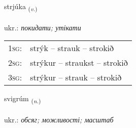\documentclass[frontgrid, backgrid]{flacards}\usepackage[]{graphicx}\usepackage[]{xcolor}
\begin{document}
\renewcommand{\flhead}{\vskip5pt \fboxsep=0pt {\small\bfseries\footnotesize Sagnorð | дієслово}}
\renewcommand{\fcfoot}{\vskip5pt \fboxsep=0pt \hspace{2pt}{\small\bfseries\footnotesize 3K}}

\renewcommand{\blhead}{\vskip5pt {\small\bfseries\footnotesize Sagnorð | дієслово }}
\renewcommand{\bcfoot}{\vskip5pt \hspace{2pt}{\small\bfseries\footnotesize 3K}}


{strjúka \small{\textsubscript{(\textit{v.})}} \\[1ex] %
\textphonetic{[strjuːka]} \\
ukr.: \emph{покидати; утікати} \\  [2ex]
\renewcommand*{\arraystretch}{0.8}
\begin{tabular}{p{1cm}l}
\textsc{1sg}: & strýk -- strauk -- strokið \\ 
\textsc{2sg}: & strýkur -- straukst -- strokið \\ 
\textsc{3sg}: & strýkur -- strauk -- strokið \\ 
\end{tabular}
}

\renewcommand{\flhead}{\vskip5pt \fboxsep=0pt {\small\bfseries\footnotesize Nafnorð | іменник}}
\renewcommand{\fcfoot}{\vskip5pt \fboxsep=0pt \hspace{2pt}{\small\bfseries\footnotesize 3K}}

\renewcommand{\blhead}{\vskip5pt {\small\bfseries\footnotesize Nafnorð | іменник }}
\renewcommand{\bcfoot}{\vskip5pt \hspace{2pt}{\small\bfseries\footnotesize 3K}}


{svigrúm \small{\textsubscript{(\textit{n.})}} \\[1ex] %
\textphonetic{[svɪɣrum]} \\
ukr.: \emph{обсяг; можливості; масштаб} \\  [2ex]
\renewcommand*{\arraystretch}{0.8}
}
\end{document}
